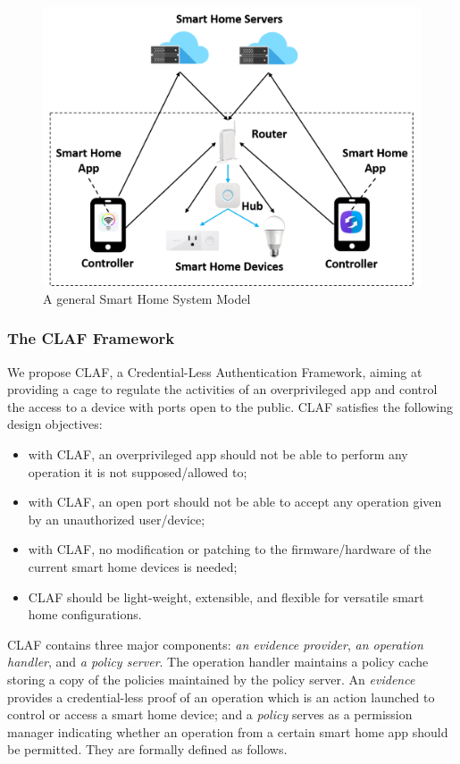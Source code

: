 \documentclass[letterpaper,12pt]{article}
\begin{document}
\begin{figure}[!htb]
        \centering
        \includegraphics[scale=0.3]{system.png}
        \caption{A general Smart Home System Model}
        \label{fig:system}
\end{figure}




\subsubsection{The CLAF Framework} \label{sec:CLAF:Framework}

We propose CLAF, a Credential-Less Authentication Framework, aiming at providing a cage to regulate the activities of an overprivileged app and control the access to a device with ports open to the public. CLAF satisfies the following design objectives:
\begin{itemize}
\item with CLAF, an overprivileged app should not be able to perform any operation it is not supposed/allowed to;
\item with CLAF, an open port should not be able to accept any operation given by an unauthorized user/device;
\item with CLAF, no modification or patching to the firmware/hardware of the current smart home devices is needed;
\item CLAF should be light-weight, extensible, and flexible for versatile smart home configurations. 
\end{itemize}

CLAF contains three major components: \emph{an evidence provider}, \emph{an operation handler}, and \emph{a policy server}. The operation handler maintains a policy cache storing a copy of the policies maintained by the policy server. An \textit{evidence} provides a credential-less proof of an operation which is an action launched to control or access a smart home device; and a \textit{policy} serves as a permission manager indicating whether an operation from a certain smart home app should be permitted. They are formally defined as follows.
\end{document}
